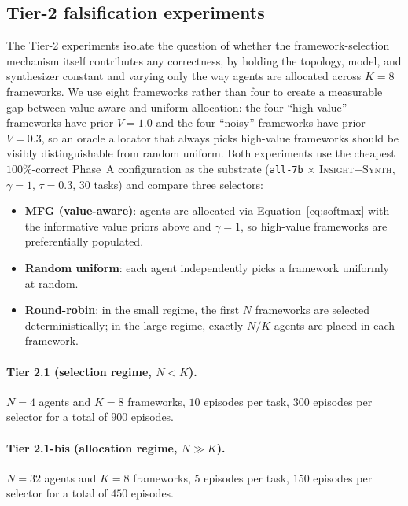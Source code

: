\documentclass[11pt]{amsart}
\newcommand{\g}{\gamma}
\newcommand\1{{\mathds{1}}}
\theoremstyle{definition}
\theoremstyle{remark}
\numberwithin{equation}{section}
\begin{document}
\subsection{Tier-2 falsification experiments}\label{app:tier2}

The Tier-2 experiments isolate the question of whether the framework-selection mechanism itself contributes any correctness, by holding the topology, model, and synthesizer constant and varying only the way agents are allocated across $K\!=\!8$ frameworks.
We use eight frameworks rather than four to create a measurable gap between value-aware and uniform allocation: the four ``high-value'' frameworks have prior $V\!=\!1.0$ and the four ``noisy'' frameworks have prior $V\!=\!0.3$, so an oracle allocator that always picks high-value frameworks should be visibly distinguishable from random uniform.
Both experiments use the cheapest $100\%$-correct Phase~A configuration as the substrate (\texttt{all-7b} $\times$ \textsc{Insight+Synth}, $\g\!=\!1$, $\tau\!=\!0.3$, $30$ tasks) and compare three selectors:
\begin{itemize}[leftmargin=1.2em, itemsep=1pt]
\item \textbf{MFG (value-aware)}: agents are allocated via Equation~\eqref{eq:softmax} with the informative value priors above and $\g\!=\!1$, so high-value frameworks are preferentially populated.
\item \textbf{Random uniform}: each agent independently picks a framework uniformly at random.
\item \textbf{Round-robin}: in the small regime, the first $N$ frameworks are selected deterministically; in the large regime, exactly $N/K$ agents are placed in each framework.
\end{itemize}

\paragraph{Tier 2.1 (selection regime, $N\!<\!K$).}
$N\!=\!4$ agents and $K\!=\!8$ frameworks, $10$ episodes per task, $300$ episodes per selector for a total of $900$ episodes.

\paragraph{Tier 2.1-bis (allocation regime, $N\!\gg\!K$).}
$N\!=\!32$ agents and $K\!=\!8$ frameworks, $5$ episodes per task, $150$ episodes per selector for a total of $450$ episodes.
\end{document}
